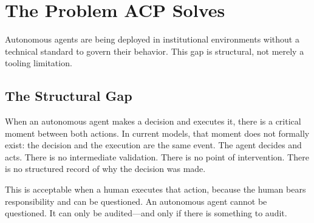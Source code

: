 \documentclass[11pt]{article}
\theoremstyle{definition}
\begin{document}
\begin{abstract}
Runtime correctness is validated by 73~signed conformance test vectors.
We demonstrate that an adversary with complete knowledge of the risk formula can suppress
BAR to $0.00$ while every individual request remains policy-compliant (Experiment~10);
BAR-Monitor detects the regime shift via $\Delta\mathrm{BAR}$ three batches before collapse,
and counterfactual evaluation confirms structural enforcement capacity is preserved
($\mathrm{BAR}_C = 1.00$).
We further identify and formalize \emph{deviation collapse}---a previously unrecognized
governance failure mode in which enforcement is active but never exercised because upstream
constraints eliminate the conditions required for \texttt{DENIED} decisions---and introduce
Boundary Activation Rate (BAR) as its detection mechanism (Experiment~9).

\textbf{Specification and implementation:} \url{https://github.com/chelof100/acp-framework-en}
\end{abstract}

\tableofcontents

\newpage

\section{The Problem ACP Solves}

Autonomous agents are being deployed in institutional environments without a technical standard to govern their behavior.
This gap is structural, not merely a tooling limitation.

\subsection{The Structural Gap}

When an autonomous agent makes a decision and executes it, there is a critical moment between both actions.
In current models, that moment does not formally exist: the decision and the execution are the same event.
The agent decides and acts. There is no intermediate validation.
There is no point of intervention. There is no structured record of why the decision was made.

This is acceptable when a human executes that action, because the human bears responsibility and can be questioned.
An autonomous agent cannot be questioned. It can only be audited---and only if there is something to audit.
\end{document}
